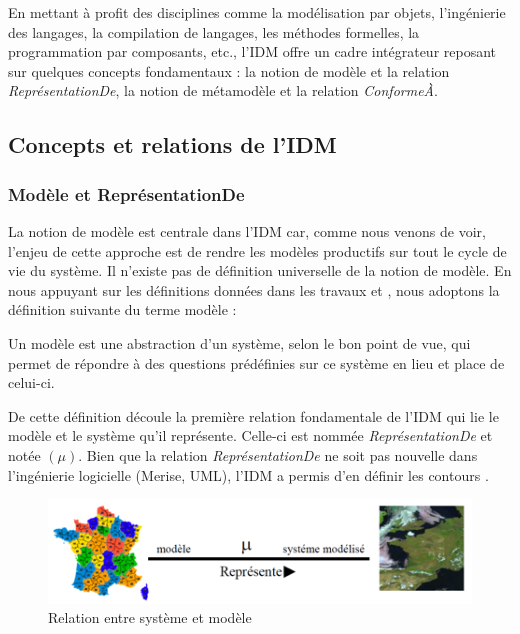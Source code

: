 En mettant à profit des disciplines comme la modélisation par objets, 
l'ingénierie des langages, la compilation de langages, les méthodes formelles, 
la programmation par composants, etc., l'IDM offre un cadre intégrateur reposant 
sur quelques concepts fondamentaux : la notion de modèle et la relation 
\textit{ReprésentationDe}, la notion de métamodèle et la relation 
\textit{ConformeÀ}.

\subsection{Concepts et relations de l'IDM}
\subsubsection{Modèle et ReprésentationDe}
La notion de modèle est centrale dans l'IDM car, comme nous venons de voir, 
l'enjeu de cette approche est de rendre les modèles productifs sur tout le cycle 
de vie du système. Il n'existe pas de définition universelle de la notion de 
modèle. En nous appuyant sur les définitions données dans les travaux 
\cite{minsky1967computation} \cite{bezivin2001towards} et 
\cite{seidewitz2003models}, nous adoptons la définition suivante du terme modèle 
:

\begin{definition}
Un modèle est une abstraction d'un système, selon le bon point de vue, qui 
permet de répondre à des questions prédéfinies sur ce système en lieu et place 
de celui-ci.
\end{definition}

De cette définition découle la première relation fondamentale de l'IDM qui lie 
le modèle et le système qu'il représente. Celle-ci est nommée 
\textit{ReprésentationDe} et notée $(\mu)$. Bien que la relation 
\textit{ReprésentationDe} ne soit pas nouvelle dans l'ingénierie logicielle 
(Merise, UML), l'IDM a permis d'en définir les contours \cite{atkinson2003model} 
\cite{seidewitz2003models} \cite{bezivin2004search}.

\begin{figure}[!htbp]
 \begin{center}
  \includegraphics[width=1\textwidth]{images/Chapitre1/favresystememodele.png}
 \end{center}
 \caption{Relation entre système et modèle \protect\cite{favre2006ingenierie}}
 \label{fig:systemModele}
\end{figure}

